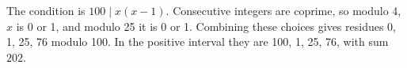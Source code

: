 The condition is $ 100\mid x(x-1)$. Consecutive integers are coprime, so modulo 4, $ x $ is 0 or 1, and modulo 25 it is 0 or 1. Combining these choices gives residues 0, 1, 25, 76 modulo 100. In the positive interval they are 100, 1, 25, 76, with sum $\boxed{202}$.
